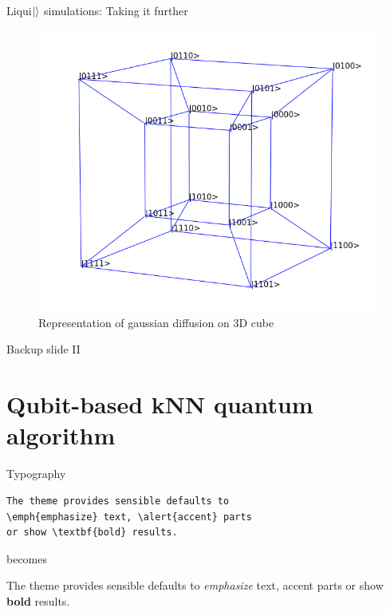 \documentclass[10pt]{beamer}
\begin{document}
{
\begin{frame}{Liqui$\ket{}$ simulations: Taking it further}

\begin{figure}
\includegraphics[scale=0.33]{4d_hypercube.png}
       \caption{\footnotesize{Representation of gaussian diffusion on 3D cube} }
\end{figure}
\end{frame}
}

\begin{frame}[allowframebreaks]{Backup slide II}

  
  

\end{frame}

\section{Qubit-based kNN quantum algorithm}

{
\begin{frame}[fragile]{Typography}
      \begin{verbatim}The theme provides sensible defaults to
\emph{emphasize} text, \alert{accent} parts
or show \textbf{bold} results.\end{verbatim}

  \begin{center}becomes\end{center}

  The theme provides sensible defaults to \emph{emphasize} text,
  \alert{accent} parts or show \textbf{bold} results.
\end{frame}
}
\end{document}

